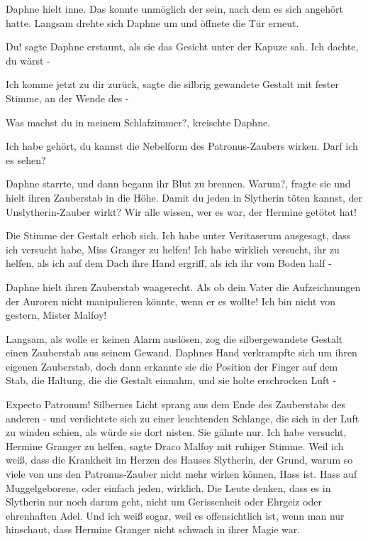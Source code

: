 Daphne hielt inne. Das konnte unmöglich der sein, nach dem es sich angehört
hatte. Langsam drehte sich Daphne um und öffnete die Tür erneut.

\glqq{}Du!\grqq{} sagte Daphne erstaunt, als sie das Gesicht unter der Kapuze
sah. \glqq{}Ich dachte, du wärst -\grqq{}

\glqq{}Ich komme jetzt zu dir zurück\grqq{}, sagte die silbrig gewandete Gestalt
mit fester Stimme, \glqq{}an der Wende des -\grqq{}

\glqq{}Was machst du in meinem Schlafzimmer?\grqq{}, kreischte Daphne.

\glqq{}Ich habe gehört, du kannst die Nebelform des Patronus-Zaubers wirken. Darf
ich es sehen?\grqq{}

Daphne starrte, und dann begann ihr Blut zu brennen. \glqq{}Warum?\grqq{}, fragte
sie und hielt ihren Zauberstab in die Höhe. \glqq{}Damit du jeden in Slytherin
töten kannst, der Unslytherin-Zauber wirkt? Wir alle wissen, wer es war, der
Hermine getötet hat!\grqq{}

Die Stimme der Gestalt erhob sich. \glqq{}Ich habe unter Veritaserum ausgesagt,
dass ich versucht habe, Miss Granger zu helfen! Ich habe wirklich versucht, ihr
zu helfen, als ich auf dem Dach ihre Hand ergriff, als ich ihr vom Boden half
-\grqq{}

Daphne hielt ihren Zauberstab waagerecht. \glqq{}Als ob dein Vater die
Aufzeichnungen der Auroren nicht manipulieren könnte, wenn er es wollte! Ich bin
nicht von gestern, Mister Malfoy!\grqq{}

Langsam, als wolle er keinen Alarm auslösen, zog die silbergewandete Gestalt
einen Zauberstab aus seinem Gewand. Daphnes Hand verkrampfte sich um ihren
eigenen Zauberstab, doch dann erkannte sie die Position der Finger auf dem Stab,
die Haltung, die die Gestalt einnahm, und sie holte erschrocken Luft -

\glqq{}Expecto Patronum!\grqq{} Silbernes Licht sprang aus dem Ende des
Zauberstabs des anderen - und verdichtete sich zu einer leuchtenden Schlange,
die sich in der Luft zu winden schien, als würde sie dort nisten. Sie gähnte
nur. \glqq{}Ich habe versucht, Hermine Granger zu helfen\grqq{}, sagte Draco
Malfoy mit ruhiger Stimme. \glqq{}Weil ich weiß, dass die Krankheit im Herzen des
Hauses Slytherin, der Grund, warum so viele von uns den Patronus-Zauber nicht
mehr wirken können, Hass ist. Hass auf Muggelgeborene, oder einfach jeden,
wirklich. Die Leute denken, dass es in Slytherin nur noch darum geht, nicht um
Gerissenheit oder Ehrgeiz oder ehrenhaften Adel. Und ich weiß sogar, weil es
offensichtlich ist, wenn man nur hinschaut, dass Hermine Granger nicht schwach
in ihrer Magie war.\grqq{}

